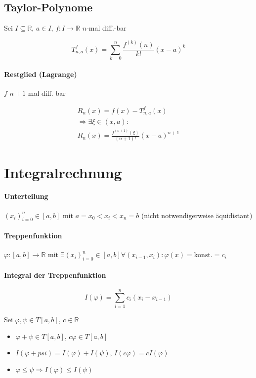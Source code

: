 \subsection{Taylor-Polynome}

Sei $I \subseteq \mathbb{R}$, $a \in I$, $f: I \rightarrow \mathbb{R}$ $n$-mal diff.-bar

$$T_{n,a}^f(x) = \sum_{k=0}^{n} \frac{f^{(k)}(n)}{k!} (x - a)^k$$

\paragraph{Restglied (Lagrange)} $f$ $n+1$-mal diff.-bar

\begin{gather*}
  R_n (x) = f(x) - T_{n, a}^f (x) \\
  \Rightarrow \exists \xi \in (x, a): \\
  R_n(x) = \frac{f^{(n + 1)} (\xi)}{(n + 1)!} (x - a)^{n + 1}
\end{gather*}

\section{Integralrechnung}

\paragraph{Unterteilung} $(x_i)_{i = 0}^n \in [a, b]$ mit $a = x_0 < x_i < x_n = b$ (nicht notwendigerweise äquidistant)

\paragraph{Treppenfunktion} $\varphi: [a, b] \rightarrow \mathbb{R}$ mit $\exists (x_i)_{i = 0}^n \in [a, b] \forall (x_{i-1}, x_i): \varphi(x) = \text{konst.} = c_i$

\paragraph{Integral der Treppenfunktion}

$$I(\varphi) = \sum_{i=1}^{n} c_i (x_i - x_{i - 1})$$

Sei $\varphi, \psi \in T[a, b]$, $c \in \mathbb{R}$
\begin{itemize}
  \item $\varphi + \psi \in T[a, b]$, $c\varphi \in T[a, b]$
  \item $I(\varphi + psi) = I(\varphi) + I(\psi)$, $I(c\varphi) = cI(\varphi)$
  \item $\varphi \leq \psi \Rightarrow I(\varphi) \leq I(\psi)$
\end{itemize}

